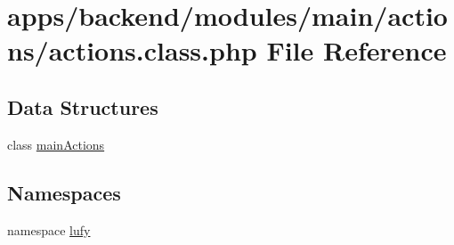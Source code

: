\hypertarget{backend_2modules_2main_2actions_2actions_8class_8php}{\section{apps/backend/modules/main/actions/actions.class.\-php File Reference}
\label{backend_2modules_2main_2actions_2actions_8class_8php}
}
\subsection*{Data Structures}
\begin{DoxyCompactItemize}
\item 
class \hyperlink{classmain_actions}{main\-Actions}
\end{DoxyCompactItemize}
\subsection*{Namespaces}
\begin{DoxyCompactItemize}
\item 
namespace \hyperlink{namespacelufy}{lufy}
\end{DoxyCompactItemize}
